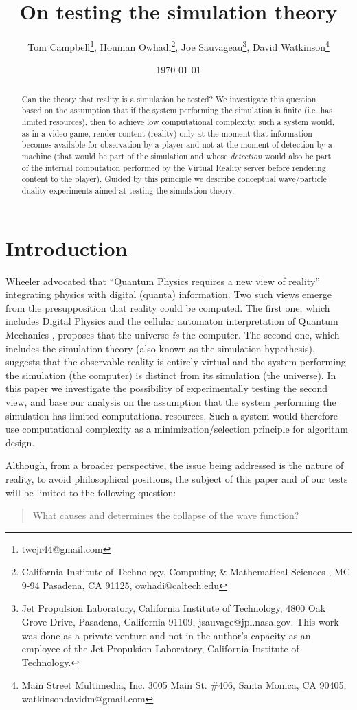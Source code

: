 \documentclass[11pt]{article}
\title{On testing the simulation theory}
\author{Tom Campbell\footnote{twcjr44@gmail.com}, Houman Owhadi\footnote{California Institute of Technology, Computing \& Mathematical Sciences , MC 9-94 Pasadena, CA 91125, owhadi@caltech.edu}, Joe Sauvageau\footnote{Jet Propulsion Laboratory, California Institute of Technology, 4800 Oak Grove Drive, Pasadena, California 91109, jsauvage@jpl.nasa.gov. This work was done as a private venture and not in the author's capacity as an employee of the Jet Propulsion Laboratory, California Institute of Technology.}, David Watkinson\footnote{Main Street Multimedia, Inc. 3005 Main St. \#406, Santa Monica, CA 90405, watkinsondavidm@gmail.com}}
\date{\today}
\theoremstyle{definition}
\begin{document}
\maketitle


\begin{abstract}
Can the theory that reality is a simulation   be tested? We investigate this question based on the assumption that if the system performing  the simulation is finite (i.e. has limited resources), then to achieve low computational complexity, such a system would, as in a video game, render  content (reality) only at the moment  that information becomes available for observation
by a player and not at the moment of detection by a machine (that would be part of the simulation and whose \emph{detection} would also be part of the internal computation performed  by the Virtual Reality server before rendering content to the player). Guided by this principle we describe  conceptual wave/particle duality experiments aimed at testing the  simulation theory.
\end{abstract}



\section{Introduction}
 Wheeler advocated \cite{Wheeler1990} that ``Quantum Physics requires a new view of reality'' integrating physics with  digital (quanta) information. Two such views emerge from the presupposition that reality could be computed. The first one, which includes
Digital Physics \cite{Zuse1967} and the cellular automaton interpretation of Quantum Mechanics  \cite{HooftG2016}, proposes that the universe \emph{is} the computer. The second one, which includes the simulation theory \cite{BOSTROM2003, Campbell2007, WhitworthB2007} (also known as the simulation hypothesis), suggests that the observable reality is entirely virtual and the system performing the simulation (the computer) is distinct from its simulation (the universe). In this paper we investigate the possibility of experimentally testing the second view, and base our analysis on the assumption that the system performing the simulation has limited computational resources. Such a system would therefore use computational complexity as a minimization/selection principle for algorithm design.

Although, from a broader perspective, the issue being addressed is the nature of reality, to avoid philosophical positions, the subject of this paper and of our tests will be limited to the following question:
\begin{quote}
What causes and determines the collapse of the wave function?
\end{quote}
\end{document}
